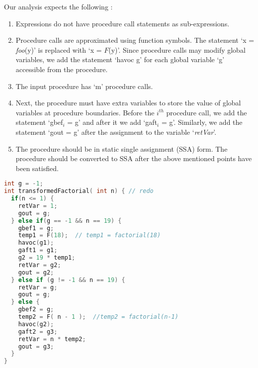 \documentclass{llncs}
\newcommand{\foo}{\textit{foo}}
\newcommand{\retVar}{\textit{retVar}}
\newcommand{\F}{\mathit{F}}
\begin{document}
Our analysis expects the following :
\begin{enumerate}
\item Expressions do not have procedure call statements as
  sub-expressions.
\item Procedure calls are approximated using function symbols. The
  statement `x = \foo(y)' is replaced with `x = $\F$(y)'. Since
  procedure calls may modify global variables, we add the statement
  `havoc g' for each global variable `g' accessible from the
  procedure.
\item The input procedure has `m' procedure calls.
\item Next, the procedure must have extra variables to store the value
  of global variables at procedure boundaries. Before the
  $\mathit{i^{th}}$ procedure call, we add the statement `gbef$_i$ =
  g' and after it we add `gaft$_i$ = g'. Similarly, we add the
  statement `gout = g' after the assignment to the variable `\retVar'.
\item The procedure should be in static single assignment (SSA)
  form. The procedure should be converted to SSA after the above
  mentioned points have been satisfied.
\end{enumerate}

\begin{lstlisting}[language=c, caption= {Procedure `factorial' from
      Listing~\ref{lst:factorialSimple} converted to the form our
      approach expects. We refer to this procedure as `transformed
      factorial'.}, label=lst:factorialTransformed]
int g = -1;
int transformedFactorial( int n) { // redo
  if(n <= 1) {
    retVar = 1;
    gout = g;
  } else if(g == -1 && n == 19) {
    gbef1 = g;
    temp1 = F(18);  // temp1 = factorial(18)
    havoc(g1);
    gaft1 = g1;
    g2 = 19 * temp1;
    retVar = g2;
    gout = g2;
  } else if (g != -1 && n == 19) {
    retVar = g;
    gout = g;
  } else {
    gbef2 = g;
    temp2 = F( n - 1 );  //temp2 = factorial(n-1)
    havoc(g2);
    gaft2 = g3;
    retVar = n * temp2;
    gout = g3;
  }
}
\end{lstlisting}

\end{document}
